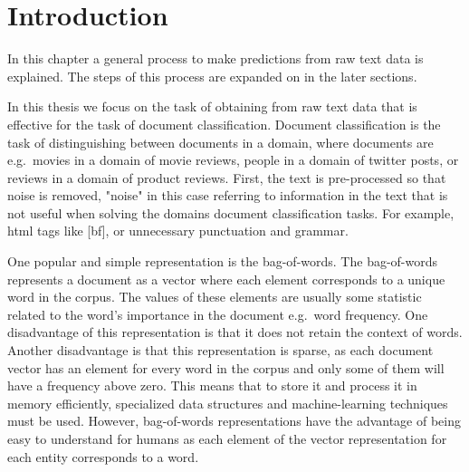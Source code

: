 
\section{Introduction}

In this chapter a general process to make predictions from raw text data is explained. The steps of this process are expanded on in the later sections.

In this thesis we focus on the task of obtaining from raw text data that is effective for the task of document classification. 
Document classification is the task of distinguishing between documents in a domain, where documents are e.g.\ movies in a domain of movie reviews, people in a domain of twitter posts, or reviews in a domain of product reviews. First, the text is pre-processed so that noise is removed, "noise" in this case referring to information in the text that is not useful when solving the domains document classification tasks. For example, html tags like [bf], or unnecessary punctuation and grammar. %

One popular and simple representation is the bag-of-words. The bag-of-words  represents a document as a vector where each element corresponds to a unique word in the corpus. The values of these elements are usually some statistic related to the word's importance in the document e.g.\ word frequency. One disadvantage of this representation is that it does not retain the context of words. Another disadvantage is that this representation is sparse, as each document vector has an element for every word in the corpus and only some of them will have a frequency above zero. This means that  to store it and process it in memory efficiently, specialized data structures and machine-learning techniques must be used. However, bag-of-words representations have the  advantage of being easy to understand for humans as each element of the vector representation for each entity corresponds to a word. 

